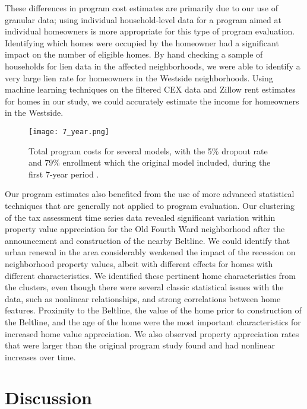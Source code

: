 \documentclass{acm_proc_article-sp}
\begin{document}
These differences in program cost estimates are primarily due to our use of granular data; using individual household-level data for a program aimed at individual homeowners is more appropriate for this type of program evaluation. Identifying which homes were occupied by the homeowner had a significant impact on the number of eligible homes. By hand checking a sample of households for lien data in the affected neighborhoods, we were able to identify a very large lien rate for homeowners in the Westside neighborhoods. Using machine learning techniques on the filtered CEX data and Zillow rent estimates for homes in our study, we could accurately estimate the income for homeowners in the Westside.

\begin{figure}[h]
\centering
  \texttt{[image: 7\_year.png]} %
\caption{Total program costs for several models, with the 5\% dropout rate and 79\% enrollment which the original model included, during the first 7-year period \cite{bed17}.}
\label{7_year}
\end{figure}

Our program estimates also benefited from the use of more advanced statistical techniques that are generally not applied to program evaluation. Our clustering of the tax assessment time series data revealed significant variation within property value appreciation for the Old Fourth Ward neighborhood after the announcement and construction of the nearby Beltline. We could identify that urban renewal in the area considerably weakened the impact of the recession on neighborhood property values, albeit with different effects for homes with different characteristics. We identified these pertinent home characteristics from the clusters, even though there were several classic statistical issues with the data, such as nonlinear relationships, and strong correlations between home features. Proximity to the Beltline, the value of the home prior to construction of the Beltline, and the age of the home were the most important characteristics for increased home value appreciation. We also observed property appreciation rates that were larger than the original program study found and had nonlinear increases over time.

\section{Discussion}
\end{document}
